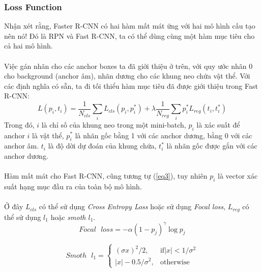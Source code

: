 \documentclass{article}
\begin{document}
\subsubsection{Loss Function}
Nhận xét rằng, Faster R-CNN có hai hàm mất mát ứng với hai mô hình cấu tạo nên nó! Đó là RPN và Fast R-CNN, ta có thể dùng cùng một hàm mục tiêu cho cả hai mô hình.\\\\
Việc gán nhãn cho các anchor boxes ta đã giới thiệu ở trên, với quy ước nhãn 0 cho background (anchor âm), nhãn dương cho các khung neo chứa vật thể. Với các định nghĩa có sẵn, ta đi tối thiểu hàm mục tiêu đã được giới thiệu trong Fast R-CNN:
\begin{equation}
    L({p_i}, {t_i}) = \frac{1}{N_{cls}} \sum_{i}L_{cls}(p_i, p^{*}_{i}) + \lambda \frac{1}{N_{reg}}\sum_{i} p^{*}_i L_{reg}(t_i, t^{*}_i)
    \label{eq3}
\end{equation}
Trong đó, $i$ là chỉ số của khung neo trong một mini-batch, $p_i$ là xác suất để anchor $i$ là vật thể, $p^{*}_i$ là nhãn gốc bằng 1 với các anchor dương, bằng 0 với các anchor âm. $t_i$ là độ dời dự đoán của khung chứa, $t^{*}_i$ là nhãn gốc được gắn với các anchor dương.\\\\
Hàm mất mát cho Fast R-CNN, cũng tương tự (\ref{eq3}), tuy nhiên $p_i$ là vector xác suất hạng mục đầu ra của toàn bộ mô hình.\\\\
Ở đây $L_{cls}$ có thể sử dụng \textit{Cross Entropy Loss} hoặc sử dụng \textit{Focal loss}, $L_{reg}$ có thể sử dụng \textit{$l_1$} hoặc \textit{smoth $l_1$}.
\begin{equation}
    Focal\text{ }loss = -\alpha (1-p_j)^\gamma \log{p_j}
    \label{eq4}
\end{equation}

\begin{equation}
    Smoth\text{ }l_1 = \begin{cases}
    (\sigma x)^2/2, & \text{if} |x|<1/\sigma^2\\
    |x|-0.5/\sigma^2, & \text{otherwise}
    \end{cases}
\end{equation}
\end{document}
